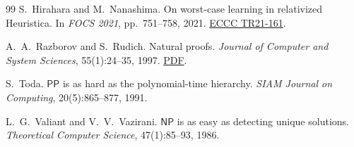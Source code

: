 \documentclass[11pt,a4paper]{article}
\theoremstyle{definition}
\theoremstyle{remark}
\newcommand{\NP}{\mathsf{NP}}
\newcommand{\PP}{\mathsf{PP}}
\begin{document}
\begin{thebibliography}{99}
S.~Hirahara and M.~Nanashima.
On worst-case learning in relativized Heuristica.
In \emph{FOCS 2021}, pp.~751--758, 2021.
\href{https://eccc.weizmann.ac.il/report/2021/161/download}{ECCC TR21-161}.

A.~A.~Razborov and S.~Rudich.
Natural proofs.
\emph{Journal of Computer and System Sciences}, 55(1):24--35, 1997.
\href{https://mit6875.github.io/PAPERS/natural_proofs.pdf}{PDF}.

S.~Toda.
$\PP$ is as hard as the polynomial-time hierarchy.
\emph{SIAM Journal on Computing}, 20(5):865--877, 1991.

L.~G.~Valiant and V.~V.~Vazirani.
$\NP$ is as easy as detecting unique solutions.
\emph{Theoretical Computer Science}, 47(1):85--93, 1986.

\end{thebibliography}
\end{document}
